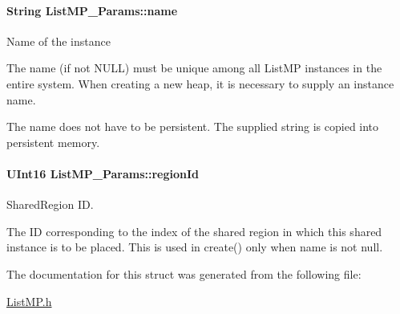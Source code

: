 \paragraph[{name}]{\setlength{\rightskip}{0pt plus 5cm}String {\bf ListMP\_\-Params::name}}\hfill\label{struct_list_m_p___params_a4ac70f37c8b5584fa115d6d7f412daba}
Name of the instance

The name (if not NULL) must be unique among all ListMP instances in the entire system. When creating a new heap, it is necessary to supply an instance name.

The name does not have to be persistent. The supplied string is copied into persistent memory. 
\paragraph[{regionId}]{\setlength{\rightskip}{0pt plus 5cm}UInt16 {\bf ListMP\_\-Params::regionId}}\hfill\label{struct_list_m_p___params_af812a3b0ea4698b841bfbf83eada903a}
SharedRegion ID.

The ID corresponding to the index of the shared region in which this shared instance is to be placed. This is used in create() only when name is not null. 

The documentation for this struct was generated from the following file:\begin{DoxyCompactItemize}
\item 
\hyperlink{_list_m_p_8h}{ListMP.h}\end{DoxyCompactItemize}
